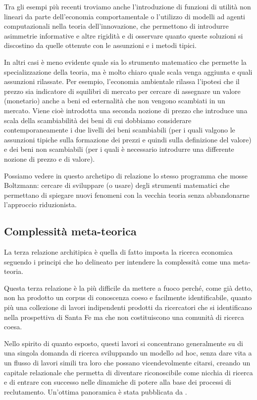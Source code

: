 \documentclass[a4paper, headings=standardclasses]{scrartcl}
\begin{document}
Tra gli esempi più recenti troviamo anche l'introduzione di funzioni di utilità non lineari
da parte dell'economia comportamentale o l'utilizzo di modelli ad agenti computazionali nella teoria dell'innovazione, che permettono di introdurre asimmetrie informative e altre rigidità e di osservare quanto queste soluzioni si discostino da quelle ottenute con le assunzioni e i metodi tipici.

In altri casi è meno evidente quale sia lo strumento matematico che permette la specializzazione della teoria, ma è molto chiaro quale scala venga aggiunta e quali assunzioni rilassate. Per esempio, l'economia ambientale rilassa l'ipotesi che il prezzo sia indicatore di squilibri di mercato per cercare di assegnare un valore (monetario) anche a beni ed esternalità che non vengono scambiati in un mercato.
Viene cioè introdotta una seconda nozione di prezzo che introduce una scala della scambiabilità dei beni di cui dobbiamo considerare contemporaneamente i due livelli dei beni scambiabili (per i quali valgono le assunzioni tipiche sulla formazione dei prezzi e quindi sulla definizione del valore) e dei beni non scambiabili (per i quali è necessario introdurre una differente nozione di prezzo e di valore).

Possiamo vedere in questo archetipo di relazione lo stesso programma che mosse Boltzmann: cercare di sviluppare (o usare) degli strumenti matematici che permettano di spiegare nuovi fenomeni con la vecchia teoria senza abbandonarne l'approccio riduzionista.

\subsection{Complessità meta-teorica}
La terza relazione architipica è quella di fatto imposta la ricerca economica seguendo i principi che ho delineato per intendere la complessità come una meta-teoria.

Questa terza relazione è la più difficile da mettere a fuoco perché, come già detto, non ha prodotto un corpus di conoscenza coeso e facilmente identificabile, quanto più una collezione di lavori indipendenti prodotti da ricercatori che si identificano nella prospettiva di Santa Fe ma che non costituiscono una comunità di ricerca coesa.

Nello spirito di quanto esposto, questi lavori si concentrano generalmente su di una singola domanda di ricerca sviluppando un modello ad hoc, senza dare vita a un flusso di lavori simili tra loro che possano vicendevolmente citarsi, creando un capitale relazionale che permetta di diventare riconoscibile come nicchia di ricerca e di entrare con successo nelle dinamiche di potere alla base dei processi di reclutamento. Un'ottima panoramica è stata pubblicata da \textcite{arthur2021}.
\end{document}

